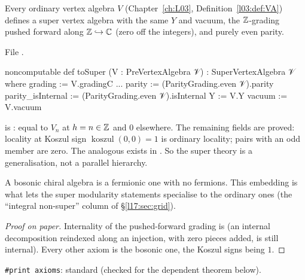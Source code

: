 \begin{proposition}\label{l17:prop:tosuper}
Every ordinary vertex algebra $V$ (Chapter~\ref{ch:L03}, Definition~\ref{l03:def:VA}) defines a super
vertex algebra with the same $Y$ and vacuum, the ${\mathbb{Z}}$-grading pushed forward along ${\mathbb{Z}}\hookrightarrow{\mathbb{C}}$
(zero off the integers), and purely even parity.
\end{proposition}
\noindent File .
\begin{leancode}
noncomputable def toSuper (V : PreVertexAlgebra 𝒱) : SuperVertexAlgebra 𝒱 where
  grading := V.gradingC
...
  parity := (ParityGrading.even 𝒱).parity
  parity_isInternal := (ParityGrading.even 𝒱).isInternal
  Y := V.Y
  vacuum := V.vacuum
\end{leancode}
\begin{dictionary}
 is : equal to $V_n$ at
$h=n\in{\mathbb{Z}}$ and $0$ elsewhere. The remaining fields are proved: locality at Koszul sign
$\operatorname{koszul}(0,0)=1$ is ordinary locality; pairs with an odd member are zero. The
analogous  exists in . So the super theory is a generalisation, not a parallel hierarchy.
\end{dictionary}
\begin{physics}
A bosonic chiral algebra is a fermionic one with no fermions. This embedding is what lets the
super modularity statements specialise to the ordinary ones (the ``integral non-super'' column of
§\ref{l17:sec:grid}).
\end{physics}
\begin{proof}[Proof on paper]
Internality of the pushed-forward grading is  (an internal decomposition
reindexed along an injection, with zero pieces added, is still internal). Every other axiom is the
bosonic one, the Koszul signs being $1$.
\end{proof}
\begin{status}
\texttt{\#print axioms}: standard (checked for the dependent theorem below).
\end{status}

